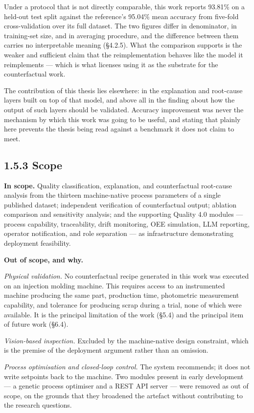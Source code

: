 Under a protocol that is not directly comparable, this work reports 93.81\% on a held-out test split against the reference's 95.04\% mean accuracy from five-fold cross-validation over its full dataset. The two figures differ in denominator, in training-set size, and in averaging procedure, and the difference between them carries no interpretable meaning (§4.2.5). What the comparison supports is the weaker and sufficient claim that the reimplementation behaves like the model it reimplements --- which is what licenses using it as the substrate for the counterfactual work.

The contribution of this thesis lies elsewhere: in the explanation and root-cause layers built on top of that model, and above all in the finding about how the output of such layers should be validated. Accuracy improvement was never the mechanism by which this work was going to be useful, and stating that plainly here prevents the thesis being read against a benchmark it does not claim to meet.

\hypertarget{scope}{%
\subsection{1.5.3 Scope}\label{scope}}

\textbf{In scope.} Quality classification, explanation, and counterfactual root-cause analysis from the thirteen machine-native process parameters of a single published dataset; independent verification of counterfactual output; ablation comparison and sensitivity analysis; and the supporting Quality 4.0 modules --- process capability, traceability, drift monitoring, OEE simulation, LLM reporting, operator notification, and role separation --- as infrastructure demonstrating deployment feasibility.

\textbf{Out of scope, and why.}

\emph{Physical validation.} No counterfactual recipe generated in this work was executed on an injection molding machine. This requires access to an instrumented machine producing the same part, production time, photometric measurement capability, and tolerance for producing scrap during a trial, none of which were available. It is the principal limitation of the work (§5.4) and the principal item of future work (§6.4).

\emph{Vision-based inspection.} Excluded by the machine-native design constraint, which is the premise of the deployment argument rather than an omission.

\emph{Process optimisation and closed-loop control.} The system recommends; it does not write setpoints back to the machine. Two modules present in early development --- a genetic process optimiser and a REST API server --- were removed as out of scope, on the grounds that they broadened the artefact without contributing to the research questions.

